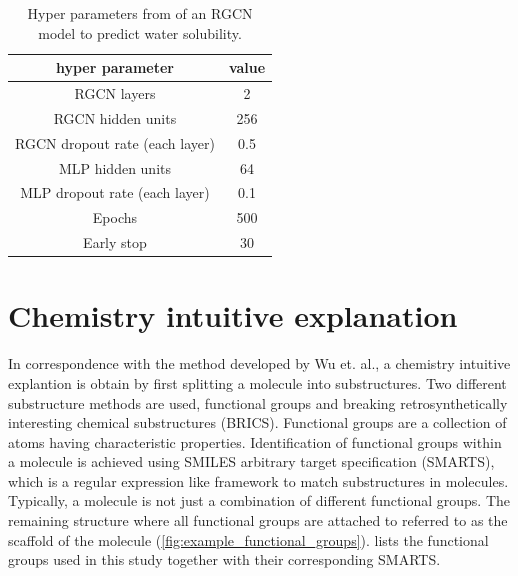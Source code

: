 \begin{table}[h]
    \caption{ Hyper parameters from \protect{} of an RGCN model to predict water solubility.}
    \label{tab:hyperparameters}
    \begin{center}
        \begin{tabular}{cc}
            \toprule
            \textbf{hyper parameter} & \textbf{value} \\
            \midrule
            RGCN layers & 2 \\
            RGCN hidden units & 256 \\
            RGCN dropout rate (each layer) & 0.5 \\
            MLP hidden units & 64 \\
            MLP dropout rate (each layer) & 0.1 \\ 
            Epochs & 500 \\
            Early stop & 30 \\
            \bottomrule
        \end{tabular}
    \end{center}
\end{table}


\newpage

\section{Chemistry intuitive explanation}


In correspondence with the method developed by Wu et. al., a chemistry intuitive 
explantion is obtain by first splitting a molecule into substructures.\cite{wu2023chemistry}
Two different substructure methods are used, functional groups and breaking retrosynthetically 
interesting chemical substructures (BRICS). Functional groups are a collection of atoms 
having characteristic properties. Identification of functional groups within a molecule 
is achieved using SMILES arbitrary target specification (SMARTS), which is a regular 
expression like framework to match substructures in molecules.\cite{smartsDaylight}
Typically, a molecule is not just a combination of different functional groups. The 
remaining structure where all functional groups are attached to referred to as the 
scaffold of the molecule (\cref{fig:example_functional_groups}).  
lists the functional groups used in this study together with their corresponding SMARTS. 


